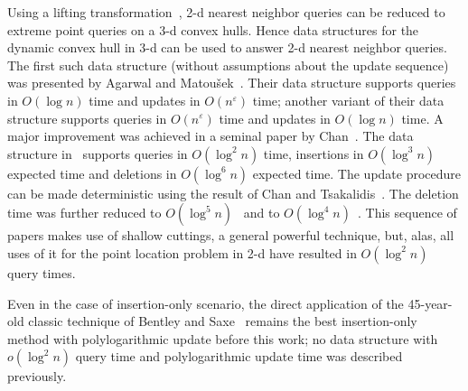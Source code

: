 \documentclass[10pt,a4paper]{amsart}
\newcommand{\eps}{\varepsilon}
\newcommand{\john}[1]{\textcolor{red}{#1}}
\begin{document}
Using a lifting transformation~\cite{BergCKO08}, 2-d nearest neighbor queries can be reduced to extreme point queries on a 3-d convex hulls. Hence data structures for the dynamic convex hull in 3-d can be used to answer 2-d nearest neighbor queries. The first such  data structure (without assumptions about the update sequence) was presented by Agarwal and Matou\v{s}ek~\cite{AgarwalM95}. Their data structure supports queries in $O(\log n)$ time and updates in $O(n^{\eps})$ time; another variant of their data structure supports queries in $O(n^{\eps})$ time and updates in $O(\log n)$ time. A major improvement was achieved in a seminal paper by Chan~\cite{Chan10}. The data structure in~\cite{Chan10} supports queries in $O(\log^2 n)$ time, insertions in $O(\log^3 n)$ expected time and deletions in $O(\log^6n)$ expected time. The update procedure can be made deterministic using the result of Chan and Tsakalidis~\cite{ChanT16}.  The deletion time was further reduced to $O(\log^5n)$~\cite{KaplanMRSS20} and to  $O(\log^4 n)$~\cite{Chan20a}. %
This sequence of papers makes use of shallow cuttings, a general powerful technique, but, alas, all uses of it for the point location problem in 2-d have resulted in $O(\log^2 n)$ query times.

Even in the case of insertion-only scenario, the direct application of the 45-year-old classic technique of Bentley and Saxe~\cite{BentleyS80} remains the best insertion-only method with polylogarithmic update before this work;
no data structure with
$o(\log^2 n)$ query time and polylogarithmic update time was described previously.
\end{document}
